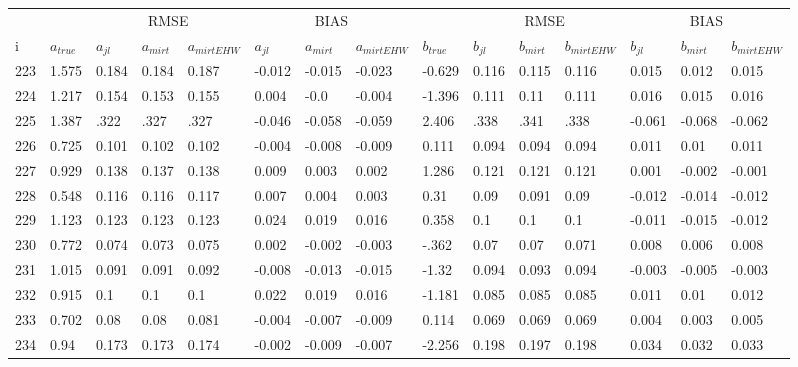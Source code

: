 \begin{table}
	\renewcommand{\arraystretch}{1}%
	\footnotesize
	\centering \begin{tabular}{|l|l|lll|lll|l|lll|lll}
		& &  \multicolumn{3}{c}{RMSE}& \multicolumn{3}{c}{BIAS}& & \multicolumn{3}{c}{RMSE}& \multicolumn{3}{c}{BIAS} \\
		i & $a_{true}$ & $a_{jl}$ & $a_{mirt}$ & $a_{mirt EHW}$ & $ a_{jl} $ & $ a_{mirt} $ & $ a_{mirt EHW} $ & $ b_{true} $ & $ b_{jl} $ & $ b_{mirt} $ & $ b_{mirt EHW} $ & $ b_{jl} $ & $b_{mirt}$ & $b_{mirt EHW}$\\
		\hline
		223 & 1.575 & 0.184 & 0.184 & 0.187 & -0.012 & -0.015 & -0.023 & -0.629 & 0.116 & 0.115 & 0.116 & 0.015 & 0.012 & 0.015 \\
		224 & 1.217 & 0.154 & 0.153 & 0.155 & 0.004 & -0.0 & -0.004 & -1.396 & 0.111 & 0.11 & 0.111 & 0.016 & 0.015 & 0.016 \\
		225 & 1.387 & .322 & .327 & .327 & -0.046 & -0.058 & -0.059 & 2.406 & .338 & .341 & .338 & -0.061 & -0.068 & -0.062 \\
		226 & 0.725 & 0.101 & 0.102 & 0.102 & -0.004 & -0.008 & -0.009 & 0.111 & 0.094 & 0.094 & 0.094 & 0.011 & 0.01 & 0.011 \\
		227 & 0.929 & 0.138 & 0.137 & 0.138 & 0.009 & 0.003 & 0.002 & 1.286 & 0.121 & 0.121 & 0.121 & 0.001 & -0.002 & -0.001 \\
		228 & 0.548 & 0.116 & 0.116 & 0.117 & 0.007 & 0.004 & 0.003 & 0.31 & 0.09 & 0.091 & 0.09 & -0.012 & -0.014 & -0.012 \\
		229 & 1.123 & 0.123 & 0.123 & 0.123 & 0.024 & 0.019 & 0.016 & 0.358 & 0.1 & 0.1 & 0.1 & -0.011 & -0.015 & -0.012 \\
		230 & 0.772 & 0.074 & 0.073 & 0.075 & 0.002 & -0.002 & -0.003 & -.362 & 0.07 & 0.07 & 0.071 & 0.008 & 0.006 & 0.008 \\
		231 & 1.015 & 0.091 & 0.091 & 0.092 & -0.008 & -0.013 & -0.015 & -1.32 & 0.094 & 0.093 & 0.094 & -0.003 & -0.005 & -0.003 \\
		232 & 0.915 & 0.1 & 0.1 & 0.1 & 0.022 & 0.019 & 0.016 & -1.181 & 0.085 & 0.085 & 0.085 & 0.011 & 0.01 & 0.012 \\
		233 & 0.702 & 0.08 & 0.08 & 0.081 & -0.004 & -0.007 & -0.009 & 0.114 & 0.069 & 0.069 & 0.069 & 0.004 & 0.003 & 0.005 \\
		234 & 0.94 & 0.173 & 0.173 & 0.174 & -0.002 & -0.009 & -0.007 & -2.256 & 0.198 & 0.197 & 0.198 & 0.034 & 0.032 & 0.033 \\

\end{tabular}
\end{table}
